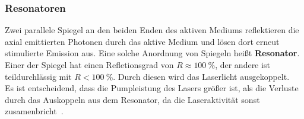         \subsubsection{Resonatoren}
        \label{sec:resonator}
            Zwei parallele Spiegel an den beiden Enden des aktiven Mediums reflektieren die axial emittierten Photonen durch das aktive Medium und lösen dort erneut stimulierte Emission aus.
            Eine solche Anordnung von Spiegeln heißt \textbf{Resonator}. 
            Einer der Spiegel hat einen Refletionsgrad von $R\approx\qty{100}{\percent}$, der andere ist teildurchlässig mit $R < \qty{100}{\percent}$.
            Durch diesen wird das Laserlicht ausgekoppelt.
            \\
            Es ist entscheidend, dass die Pumpleistung des Lasers größer ist, als die Verluste durch das Auskoppeln aus dem Resonator, da die Laseraktivität sonst zusamenbricht~\cite[41 f.]{eichler_2015}. %
